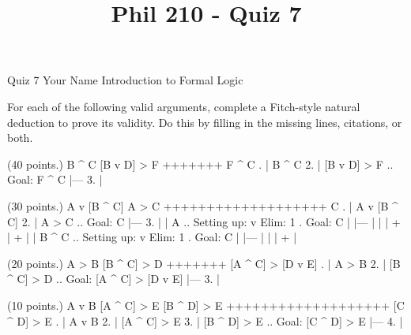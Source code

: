
\title{Phil 210 - Quiz 7}

\heading
Quiz 7
Your Name
Introduction to Formal Logic
\endheading

For each of the following valid arguments, complete a Fitch-style natural deduction to prove its validity. Do this by filling in the missing lines, citations, or both.

\problems
{} (40 points.)
\argument
 B ^ C
 [B v D] > F
+++++++
 F ^ C
\endargument
        \answer
        . | B ^ C
         2. | [B v D] > F  ..  Goal: F ^ C
            |---
         3. | 
        \endfitchproof
        \endanswer

 (30 points.)
\argument
 A v [B ^ C]
 A > C
+++++++++++++++++++
 C
\endargument
        \answer
        . | A v [B ^ C]
         2. | A > C        ..  Goal: C
            |---
         3. |   | A        ..  Setting up: v Elim: 1  .  Goal: C
            |   |---
            |   | 
            |   + 
            |   + 
            |   | B ^ C    ..  Setting up: v Elim: 1  .  Goal: C
            |   |---
            |   |
            |   +
            | 
        \endfitchproof
        \endanswer

 (20 points.)
\argument
 A > B
 [B ^ C] > D
+++++++
 [A ^ C] > [D v E]
\endargument
        \answer
        . | A > B
         2. | [B ^ C] > D  ..  Goal: [A ^ C] > [D v E]
            |---
         3. | 
        \endfitchproof
        \endanswer

 (10 points.)
\argument
 A v B
 [A ^ C] > E
 [B ^ D] > E
+++++++++++++++++++
 [C ^ D] > E
\endargument
        \answer
        . | A v B
         2. | [A ^ C] > E
         3. | [B ^ D] > E  ..  Goal: [C ^ D] > E
            |---
         4. | 
        \endfitchproof
        \endanswer

\endproblems
\bye
